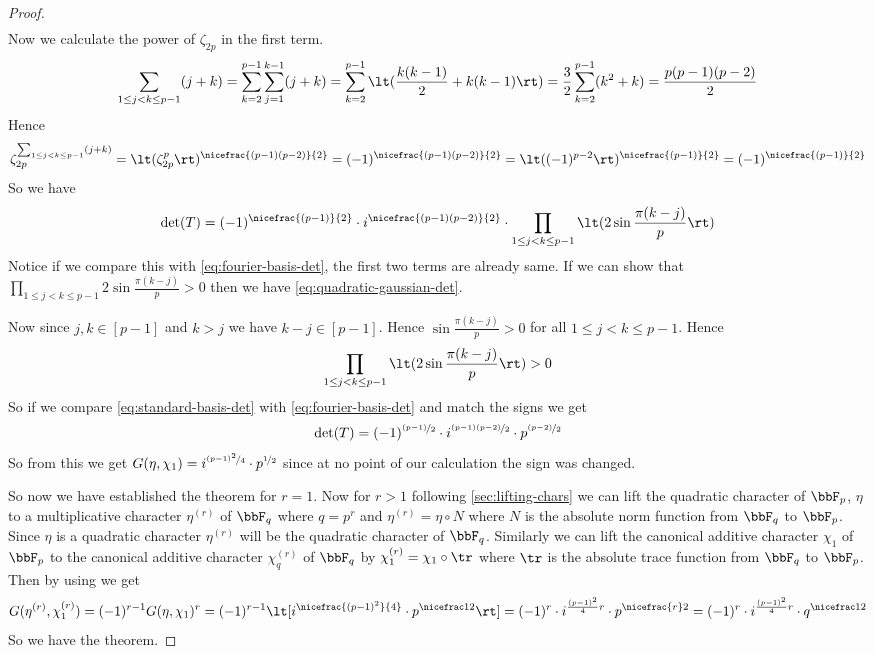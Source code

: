 \begin{proof}
\begin{align*}
  \end{align*}
  Now we calculate the power of $\zeta_{2p}$ in the first term. $$\sum_{1\leq j<k\leq p-1}(j+k)=\sum_{k=2}^{p-1}\sum_{j=1}^{k-1}(j+k)=\sum_{k=2}^{p-1}\lt(\frac{k(k-1)}2+k(k-1)\rt)=\frac32\sum_{k=2}^{p-1}(k^2+k)=\frac{p(p-1)(p-2)}2$$Hence $$\zeta_{2p}^{\sum_{1\leq j<k\leq p-1}(j+k)} = \lt(\zeta_{2p}^p\rt)^{\nicefrac{(p-1)(p-2)}{2}}=(-1)^{\nicefrac{(p-1)(p-2)}{2}}=\lt((-1)^{p-2}\rt)^{\nicefrac{(p-1)}{2}}=(-1)^{\nicefrac{(p-1)}{2}}$$So we have \begin{equation}\label{eq:standard-basis-det}
    \det(T)=(-1)^{\nicefrac{(p-1)}{2}}\cdot i^{\nicefrac{(p-1)(p-2)}{2}}\cdot \prod_{1\leq j<k\leq p-1} \lt(2\sin\frac{\pi(k-j)}{p}\rt)
  \end{equation}Notice if we compare this with \eqref{eq:fourier-basis-det}, the first two terms are already same. If we can show that $\prod_{1\leq j<k\leq p-1} 2\sin\frac{\pi(k-j)}{p}>0$ then we have \eqref{eq:quadratic-gaussian-det}. 
  
  Now since $j,k\in[p-1]$ and $k>j$ we have $k-j\in[p-1]$. Hence $\sin\frac{\pi(k-j)}{p}>0$ for all $1\leq j<k\leq p-1$. Hence $$\prod_{1\leq j<k\leq p-1} \lt(2\sin\frac{\pi(k-j)}{p}\rt) >0$$ So if we compare \eqref{eq:standard-basis-det} with \eqref{eq:fourier-basis-det} and match the signs we get $$\det(T)=(-1)^{\nicefrac{(p-1)}{2}}\cdot i^{\nicefrac{(p-1)(p-2)}2}\cdot p^{\nicefrac{(p-2)}{2}}$$So from this we get $G(\eta,\chi_1)=i^{\nicefrac{(p-1)^2}{4}}\cdot p^{\nicefrac12}$ since at no point of our calculation the sign was changed. 

  So now we have established the theorem for $r=1$. Now for $r>1$ following \autoref{sec:lifting-chars} we can lift the quadratic character of $\bbF_p$, $\eta$ to a multiplicative character $\eta^{(r)}$ of $\bbF_q$ where $q=p^r$ and $\eta^{(r)}=\eta\circ N$ where $N$ is the absolute norm function from $\bbF_q$ to $\bbF_p$. Since $\eta$ is a quadratic character $\eta^{(r)}$ will be the quadratic character of $\bbF_q$. Similarly we can lift the canonical additive character $\chi_1$ of $\bbF_p$ to the canonical additive character $\chi_q^{(r)}$ of $\bbF_q$ by $\chi_1^{(r)}=\chi_1\circ \tr$ where $\tr$ is the absolute trace function from $\bbF_q$ to $\bbF_p$. Then by using \DHthm we get $$    G(\eta^{(r)},\chi_1^{(r)}) = (-1)^{r-1}G(\eta,\chi_1)^r = (-1)^{r-1}\lt[i^{\nicefrac{(p-1)^2}{4}}\cdot p^{\nicefrac12}\rt]=(-1)^r \cdot i^{\frac{(p-1)^2}{4}r}\cdot p^{\nicefrac{r}2}=(-1)^r \cdot i^{\frac{(p-1)^2}{4}r}\cdot q^{\nicefrac12}$$So we have the theorem.
\end{proof}

